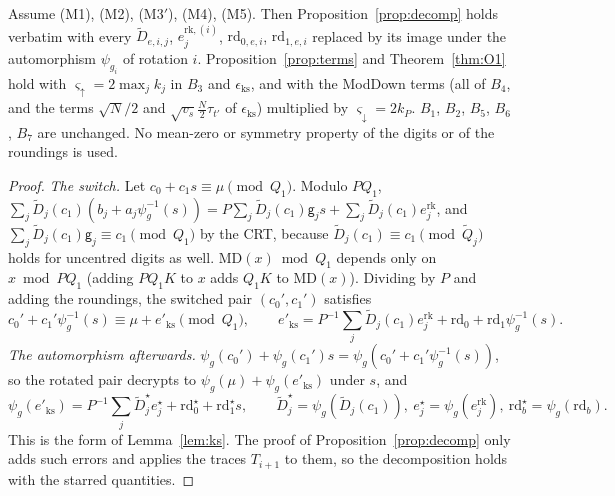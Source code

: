 \begin{lemma}\label{lem:gadget}
Assume (M1), (M2), (M3$'$), (M4), (M5). Then Proposition~\ref{prop:decomp} holds verbatim with every $\tilde D_{e,i,j}$, $e^{\mathrm{rk},(i)}_j$, $\mathrm{rd}_{0,e,i}$, $\mathrm{rd}_{1,e,i}$ replaced by its image under the automorphism $\psi_{g_i}$ of rotation $i$. Proposition~\ref{prop:terms} and Theorem~\ref{thm:O1} hold with $\varsigma_\uparrow=2\max_jk_j$ in $B_3$ and $\epsilon_{\mathrm{ks}}$, and with the ModDown terms (all of $B_4$, and the terms $\sqrt N/2$ and $\sqrt{v_s}\tfrac N2\tau_{t'}$ of $\epsilon_{\mathrm{ks}}$) multiplied by $\varsigma_\downarrow=2k_P$. $B_1$, $B_2$, $B_5$, $B_6$, $B_7$ are unchanged. No mean-zero or symmetry property of the digits or of the roundings is used.
\end{lemma}
\begin{proof}
\emph{The switch.} Let $c_0+c_1s\equiv\mu\pmod{Q_1}$. Modulo $PQ_1$, $\sum_j\tilde D_j(c_1)(b_j+a_j\psi_g^{-1}(s))=P\sum_j\tilde D_j(c_1)\mathsf g_js+\sum_j\tilde D_j(c_1)e^{\mathrm{rk}}_j$, and $\sum_j\tilde D_j(c_1)\mathsf g_j\equiv c_1\pmod{Q_1}$ by the CRT, because $\tilde D_j(c_1)\equiv c_1\pmod{\tilde Q_j}$ holds for uncentred digits as well. $\mathrm{MD}(x)\bmod Q_1$ depends only on $x\bmod PQ_1$ (adding $PQ_1K$ to $x$ adds $Q_1K$ to $\mathrm{MD}(x)$). Dividing by $P$ and adding the roundings, the switched pair $(c_0',c_1')$ satisfies
\[
  c_0'+c_1'\psi_g^{-1}(s)\equiv\mu+e'_{\mathrm{ks}}\pmod{Q_1},\qquad e'_{\mathrm{ks}}=P^{-1}\sum_j\tilde D_j(c_1)e^{\mathrm{rk}}_j+\mathrm{rd}_0+\mathrm{rd}_1\psi_g^{-1}(s).
\]
\emph{The automorphism afterwards.} $\psi_g(c_0')+\psi_g(c_1')s=\psi_g(c_0'+c_1'\psi_g^{-1}(s))$, so the rotated pair decrypts to $\psi_g(\mu)+\psi_g(e'_{\mathrm{ks}})$ under $s$, and
\[
  \psi_g(e'_{\mathrm{ks}})=P^{-1}\sum_j\tilde D^\star_j e^\star_j+\mathrm{rd}^\star_0+\mathrm{rd}^\star_1s,\qquad \tilde D^\star_j=\psi_g(\tilde D_j(c_1)),\ e^\star_j=\psi_g(e^{\mathrm{rk}}_j),\ \mathrm{rd}^\star_b=\psi_g(\mathrm{rd}_b).
\]
This is the form of Lemma~\ref{lem:ks}. The proof of Proposition~\ref{prop:decomp} only adds such errors and applies the traces $T_{i+1}$ to them, so the decomposition holds with the starred quantities.


\end{proof}
